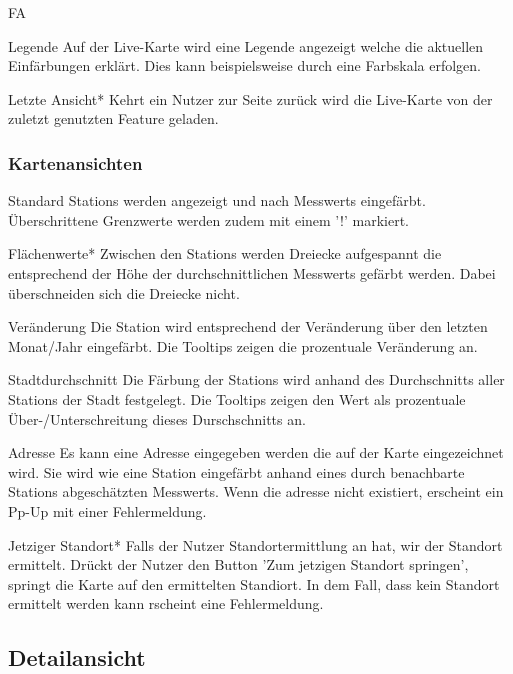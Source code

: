 \begin{Kriterien}{FA}
 \item[Legende]
  Auf der \gls{Live-Karte} wird eine Legende angezeigt welche die aktuellen Einfärbungen erklärt.
  Dies kann beispielsweise durch eine Farbskala erfolgen.

 \item[Letzte Ansicht*]
  Kehrt ein Nutzer zur Seite zurück wird die \gls{Live-Karte} von der zuletzt genutzten \gls{Feature} geladen.

 \subsubsection*{Kartenansichten}

 \item[Standard]
  \glspl{Station} werden angezeigt und nach \glspl{Messwert} eingefärbt. 
  Überschrittene Grenzwerte werden zudem mit einem '!' markiert.

 \item[Flächenwerte*]
   Zwischen den \glspl{Station} werden Dreiecke aufgespannt die entsprechend der Höhe der durchschnittlichen \glspl{Messwert} gefärbt werden.
   Dabei überschneiden sich die Dreiecke nicht.

 \item[Veränderung]
   Die \gls{Station} wird entsprechend der Veränderung über den letzten Monat/Jahr eingefärbt.
   Die \glspl{Tooltip} zeigen die prozentuale Veränderung an.

 \item[Stadtdurchschnitt]
  Die Färbung der \glspl{Station} wird anhand des Durchschnitts aller \glspl{Station} der Stadt festgelegt.
  Die \glspl{Tooltip} zeigen den Wert als prozentuale Über-/Unterschreitung dieses Durschschnitts an. 

 \item[Adresse]
   Es kann eine Adresse eingegeben werden die auf der Karte eingezeichnet wird.
   Sie wird wie eine \gls{Station} eingefärbt anhand eines durch benachbarte \glspl{Station} abgeschätzten \gls{Messwert}s. Wenn die adresse nicht existiert, erscheint ein Pp-Up mit einer Fehlermeldung.
   
 	\item[Jetziger Standort*] Falls der Nutzer Standortermittlung an hat, wir der Standort ermittelt. Drückt der Nutzer den Button 'Zum jetzigen Standort springen', springt die Karte auf den ermittelten Standiort. In dem Fall, dass kein Standort ermittelt werden kann rscheint eine Fehlermeldung.

\subsection{Detailansicht}


\end{Kriterien}
